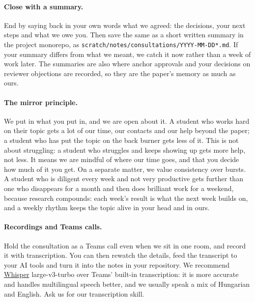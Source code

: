 \paragraph{Close with a summary.} End by saying back in your own words what we agreed: the decisions, your next steps and what we owe you. Then save the same as a short written summary in the project monorepo, as \texttt{scratch/notes/consultations/YYYY-MM-DD*.md}. If your summary differs from what we meant, we catch it now rather than a week of work later. The summaries are also where anchor approvals and your decisions on reviewer objections are recorded, so they are the paper's memory as much as ours.

\paragraph{The mirror principle.} We put in what you put in, and we are open about it. A student who works hard on their topic gets a lot of our time, our contacts and our help beyond the paper; a student who has put the topic on the back burner gets less of it. This is not about struggling: a student who struggles and keeps showing up gets more help, not less. It means we are mindful of where our time goes, and that you decide how much of it you get. On a separate matter, we value consistency over bursts. A student who is diligent every week and not very productive gets further than one who disappears for a month and then does brilliant work for a weekend, because research compounds: each week's result is what the next week builds on, and a weekly rhythm keeps the topic alive in your head and in ours.

\paragraph{Recordings and Teams calls.} Hold the consultation as a Teams call even when we sit in one room, and record it with transcription. You can then rewatch the details, feed the transcript to your AI tools and turn it into the notes in your repository. We recommend \href{https://github.com/openai/whisper}{Whisper} large-v3-turbo over Teams' built-in transcription: it is more accurate and handles multilingual speech better, and we usually speak a mix of Hungarian and English. Ask us for our transcription skill.
